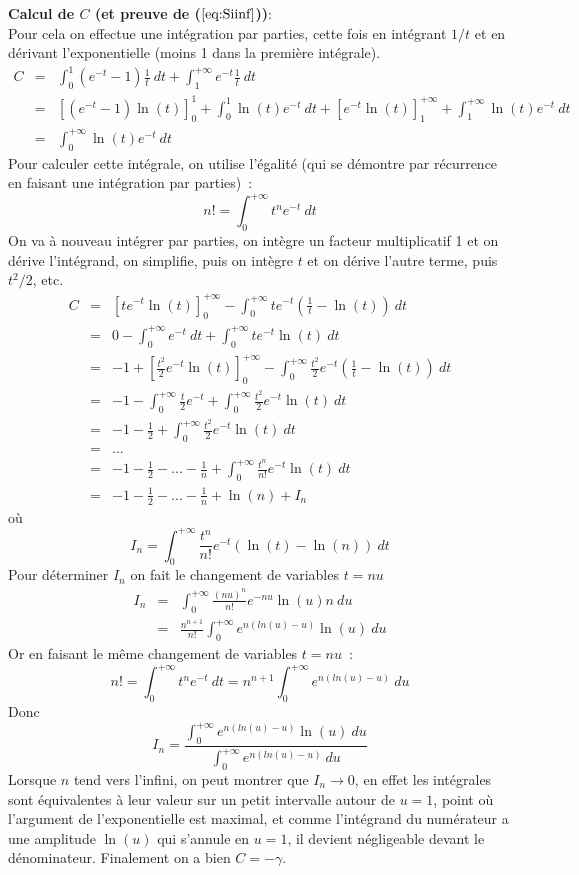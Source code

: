 \documentclass[a4paper,11pt]{book}
\begin{document}
\begin{giacjshere}
{\bf Calcul de $C$ (et preuve de (\(\ref{eq:Siinf}\)))}:\\
Pour cela on effectue une intégration par parties, cette fois en intégrant $1/t$
et en dérivant l'exponentielle (moins 1 dans la première intégrale).
\begin{eqnarray*}
 C&=&\int_0^{1}(e^{-t}-1)\frac{1}{t} \ dt + \int_1^{+\infty} e^{-t} \frac{1}{t} \ dt\\
&=&[(e^{-t}-1)\ln(t)]_0^1 +\int_0^1 \ln(t) e^{-t} \ dt + [e^{-t} \ln(t)]_1^{+\infty}
+\int_1^{+\infty} \ln(t) e^{-t} \ dt \\
&=& \int_0^{+\infty} \ln(t) e^{-t} \ dt
\end{eqnarray*}
Pour calculer cette intégrale, on utilise
l'égalité (qui se démontre par récurrence en faisant une 
intégration par parties)~:
\[ n!= \int_0^{+\infty}t^n e^{-t} \ dt \]
On va à nouveau intégrer par parties,
on intègre un facteur multiplicatif 1 
et on dérive l'intégrand, on simplifie, puis
on intègre $t$ et on dérive l'autre terme, puis $t^2/2$, etc. 
\begin{eqnarray*}
 C&=&[te^{-t} \ln(t)]_0^{+\infty} - \int_0^{+\infty} t e^{-t}(\frac{1}{t}-\ln(t)) \ dt \\
&=& 0 - \int_0^{+\infty} e^{-t} \ dt + \int_0^{+\infty} t e^{-t} \ln(t) \ dt \\
&=& -1 + [\frac{t^2}{2}e^{-t} \ln(t)]_0^{+\infty} 
- \int_0^{+\infty} \frac{t^2}{2} e^{-t}(\frac{1}{t}-\ln(t)) \ dt \\
&=& -1 - \int_0^{+\infty} \frac{t}{2} e^{-t} +  \int_0^{+\infty} \frac{t^2}{2} e^{-t} \ln(t) \ dt \\
&=& -1 - \frac{1}{2} +  \int_0^{+\infty} \frac{t^2}{2} e^{-t} \ln(t) \ dt \\
&=& ...\\
&=& -1 - \frac{1}{2} - ... -  \frac{1}{n} + \int_0^{+\infty} \frac{t^n}{n!} e^{-t} \ln(t) \ dt \\
&=& -1 - \frac{1}{2} - ... -  \frac{1}{n} + \ln(n) + I_n
\end{eqnarray*}
où
\[ I_n=\int_0^{+\infty} \frac{t^n}{n!} e^{-t} (\ln(t)-\ln(n)) \ dt \]
Pour déterminer $I_n$ on fait le changement de variables $t=nu$
\begin{eqnarray*}
 I_n&=&\int_0^{+\infty} \frac{(nu)^n}{n!} e^{-nu} \ln(u) n\ du \\
&=& \frac{n^{n+1}}{n!} \int_0^{+\infty} e^{n(ln(u)-u)} \ln(u) \ du 
\end{eqnarray*}
Or en faisant le même changement de variables $t=nu$~:
\[ n!= \int_0^{+\infty}t^n e^{-t} \ dt = n^{n+1} \int_0^{+\infty} e^{n(ln(u)-u)} \ du
\]
Donc
\[ I_n= \frac{\int_0^{+\infty} e^{n(ln(u)-u)} \ln(u) \ du}
{\int_0^{+\infty} e^{n(ln(u)-u)} \ du}  \]
Lorsque $n$ tend vers l'infini, on peut montrer que $I_n \rightarrow 0$, en effet les intégrales
sont équivalentes à leur valeur sur un petit intervalle autour de $u=1$, point où l'argument
de l'exponentielle est maximal, 
et comme l'intégrand du numérateur a une amplitude $\ln(u)$ qui s'annule en $u=1$, 
il devient négligeable devant le dénominateur. Finalement on a bien $C=-\gamma$.


\end{giacjshere}
\end{document}
